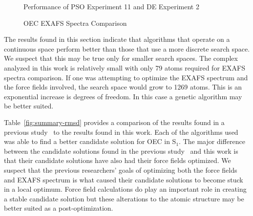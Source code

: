 \begin{figure}
	\centering
	\caption{Performance of PSO Experiment 11 and DE Experiment 2}
	\label{fig:generational-data-pso-de}
\end{figure}

\begin{figure*}
	\centering
	\caption{OEC EXAFS Spectra Comparison}
	\label{fig:pso-best}
\end{figure*}

The results found in this section indicate that algorithms that operate on a continuous space perform better than those that use a more discrete search space. We suspect that this may be true only for smaller search spaces. The complex analyzed in this work is relatively small with only 79 atoms required for EXAFS spectra comparison. If one was attempting to optimize the EXAFS spectrum and the force fields involved, the search space would grow to 1269 atoms. This is an exponential increase is degrees of freedom. In this case a genetic algorithm may be better suited.

Table~\ref{fig:summary-rmsd} provides a comparison of the results found in a previous study~\cite{luber2011s1} to the results found in this work. Each of the algorithms used was able to find a better candidate solution for OEC in S$_{1}$. The major difference between the candidate solutions found in the previous study~\cite{luber2011s1} and this work is that their candidate solutions have also had their force fields optimized. We suspect that the previous researchers' goals of optimizing both the force fields and EXAFS spectrum is what caused their candidate solutions to become stuck in a local optimum. Force field calculations do play an important role in creating a stable candidate solution but these alterations to the atomic structure may be better suited as a post-optimization.

